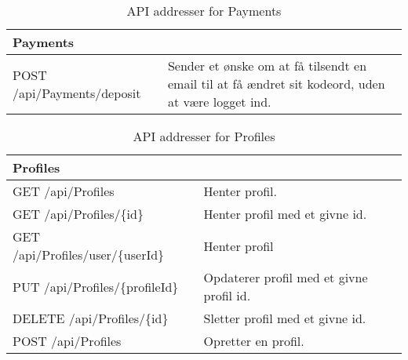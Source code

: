 \begin{table}[H]
	\centering
	\caption{API addresser for Payments}
	\label{tab:web_user}
	\begin{tabular}{p{5cm}|p{11cm}}
		\hline
		\multicolumn{2}{l}{\textbf{Payments}}\\
		\hline
		POST \newline
		/api/Payments/deposit &
		Sender et ønske om at få tilsendt en email til at få ændret sit kodeord, uden at være logget ind. 
		\\
		\hline
	\end{tabular}
\end{table}
\newpage
\begin{table}[H]
	\centering
	\caption{API addresser for Profiles}
	\label{tab:web_user}
	\begin{tabular}{p{5cm}|p{11cm}}
		\hline
		\multicolumn{2}{l}{\textbf{Profiles}}\\
		\hline
		GET \newline
		/api/Profiles &
		Henter profil. \\
        \hline
        GET \newline
		/api/Profiles/\{id\} &
		Henter profil med et givne id. \\
        \hline
        GET \newline
		/api/Profiles/user/\{userId\} &
		Henter profil \\
		\hline
		PUT \newline
		/api/Profiles/\{profileId\} &
		Opdaterer profil med et givne profil id. \\
		\hline
		DELETE \newline
		/api/Profiles/\{id\} &
		Sletter profil med et givne id. \\
		\hline
		POST \newline
		/api/Profiles &
		Opretter en profil. \\
		\hline
		
	\end{tabular}
\end{table}

